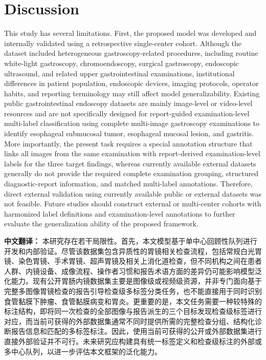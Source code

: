 \documentclass[Afour,sagev,times]{sagej}
\begin{document}
\section{Discussion}

This study has several limitations. First, the proposed model was developed and internally validated using a retrospective single-center cohort. Although the dataset included heterogeneous gastroscopy-related procedures, including routine white-light gastroscopy, chromoendoscopy, surgical gastroscopy, endoscopic ultrasound, and related upper gastrointestinal examinations, institutional differences in patient population, endoscopic devices, imaging protocols, operator habits, and reporting terminology may still affect model generalizability. Existing public gastrointestinal endoscopy datasets are mainly image-level or video-level resources and are not specifically designed for report-guided examination-level multi-label classification using complete multi-image gastroscopy examinations to identify esophageal submucosal tumor, esophageal mucosal lesion, and gastritis. More importantly, the present task requires a special annotation structure that links all images from the same examination with report-derived examination-level labels for the three target findings, whereas currently available external datasets generally do not provide the required complete examination grouping, structured diagnostic-report information, and matched multi-label annotations. Therefore, direct external validation using currently available public or external datasets was not feasible. Future studies should construct external or multi-center cohorts with harmonized label definitions and examination-level annotations to further evaluate the generalization ability of the proposed framework.

\textbf{中文翻译：} 本研究存在若干局限性。首先，本文模型基于单中心回顾性队列进行开发和内部验证。尽管该数据集包含异质性的胃镜相关检查流程，包括常规白光胃镜、染色胃镜、手术胃镜、超声胃镜及相关上消化道检查，但不同机构之间在患者人群、内镜设备、成像流程、操作者习惯和报告术语方面的差异仍可能影响模型泛化能力。现有公开胃肠内镜数据集主要是图像级或视频级资源，并非专门面向基于完整多图像胃镜检查的报告引导检查级多标签分类任务，也不能直接用于同时识别食管黏膜下肿瘤、食管黏膜病变和胃炎。更重要的是，本文任务需要一种较特殊的标注结构，即将同一次检查的全部图像与报告派生的三个目标发现检查级标签进行对应，而当前可获得的外部数据集通常不同时提供所需的完整检查分组、结构化诊断报告信息和匹配的多标签标注。因此，使用当前可获得的公开或外部数据集进行直接外部验证并不可行。未来研究应构建具有统一标签定义和检查级标注的外部或多中心队列，以进一步评估本文框架的泛化能力。
\end{document}
